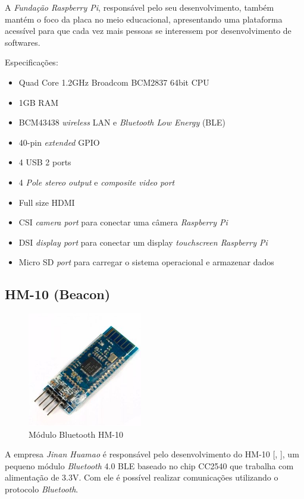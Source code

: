 \documentclass[
	12pt,				%
	oneside,			%
	a4paper,			%
	brazil				%
]{abntex2}
\newcommand{\citecustom}[1]{[\citeauthoronline{#1}, \citeyear{#1}]}
\begin{document}
A \textit{Fundação Raspberry Pi}, responsável pelo seu desenvolvimento, também mantém o foco da placa no meio educacional, apresentando uma plataforma acessível para que cada vez mais pessoas se interessem por desenvolvimento de softwares.

Especificações:

\begin{itemize}
\item Quad Core 1.2GHz Broadcom BCM2837 64bit CPU
\item 1GB RAM
\item BCM43438 \textit{wireless} LAN e \textit{Bluetooth Low Energy} (BLE)
\item 40-pin \textit{extended} GPIO
\item 4 USB 2 ports
\item 4 \textit{Pole stereo output} e \textit{composite video port}
\item Full size HDMI
\item CSI \textit{camera port} para conectar uma câmera \textit{Raspberry Pi}
\item DSI \textit{display port} para conectar um display \textit{touchscreen Raspberry Pi}
\item Micro SD \textit{port} para carregar o sistema operacional e armazenar dados
\end{itemize}


\subsection{HM-10 (Beacon)}

\begin{figure}[H]
\centering
\includegraphics[width=5cm, center]{images/hm-10}
\caption{Módulo Bluetooth HM-10}
\label{Rotulo}
\end{figure}

A empresa \textit{Jinan Huamao} é responsável pelo desenvolvimento do HM-10 \citecustom{jinanhuamao}, um pequeno módulo \textit{Bluetooth} 4.0 BLE baseado no chip CC2540 que trabalha com alimentação de 3.3V. Com ele é possível realizar comunicações utilizando o protocolo \textit{Bluetooth}.
\end{document}
